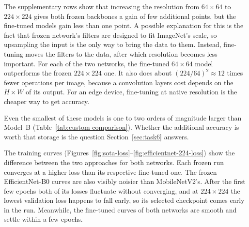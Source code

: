 The supplementary rows show that increasing the resolution from $64\times64$ to $224\times224$ gives both frozen backbones a gain of
few additional points, but the fine-tuned models gain less than one point. A possible explanation for this is the fact that frozen
network's filters are designed to fit ImageNet's scale, so upsampling the input
is the only way to bring the data to them. Instead, fine-tuning moves the
filters to the data, after which resolution becomes less important. For each of the two
networks, the fine-tuned $64\times64$ model outperforms the frozen
$224\times224$ one. It also does about $(224/64)^2\approx12$ times fewer
operations per image, because a convolution layers cost depends on the $H\times W$
of its output. For an edge device,
fine-tuning at native resolution is the cheaper way to get accuracy.

Even the smallest of these models is one to two orders of magnitude larger than Model~B (Table~\ref{tab:custom-comparison}). Whether the additional accuracy is worth that storage is the
question Section~\ref{sec:task6} answers.

The training curves (Figures~\ref{fig:sota-loss}--\ref{fig:efficientnet-224-loss})
show the difference between the two approaches for both networks. Each frozen
run converges at a higher loss than its respective fine-tuned one. The frozen
EfficientNet-B0 curves are also visibly noisier than MobileNetV2's. After the
first few epochs both of its losses fluctuate without converging, and at $224\times224$ the lowest validation loss happens to fall early,
so its selected checkpoint comes early in the run. Meanwhile, the fine-tuned curves of
both networks are smooth and settle within a few epochs.

